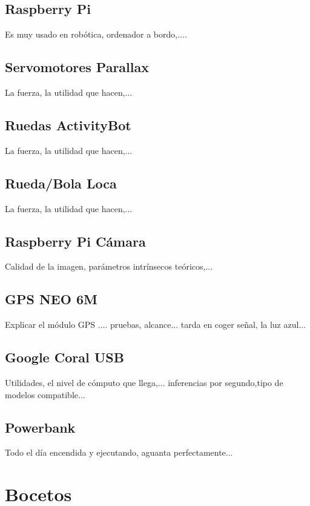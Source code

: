 \subsection{Raspberry Pi}

Es muy usado en robótica, ordenador a bordo,....

\subsection{Servomotores Parallax}
La fuerza, la utilidad que hacen,...


\subsection{Ruedas ActivityBot}
La fuerza, la utilidad que hacen,...

\subsection{Rueda/Bola Loca}
La fuerza, la utilidad que hacen,...

\subsection{Raspberry Pi Cámara}

Calidad de la imagen, parámetros intrínsecos teóricos,... 

\subsection{GPS NEO 6M}
Explicar el módulo GPS .... pruebas, alcance... tarda en coger señal, la luz azul...

\subsection{Google Coral USB}

Utilidades, el nivel de cómputo que llega,... inferencias por segundo,tipo de modelos compatible...

\subsection{Powerbank}
 
 Todo el día encendida y ejecutando, aguanta perfectamente... 
 
  
\section{Bocetos}

